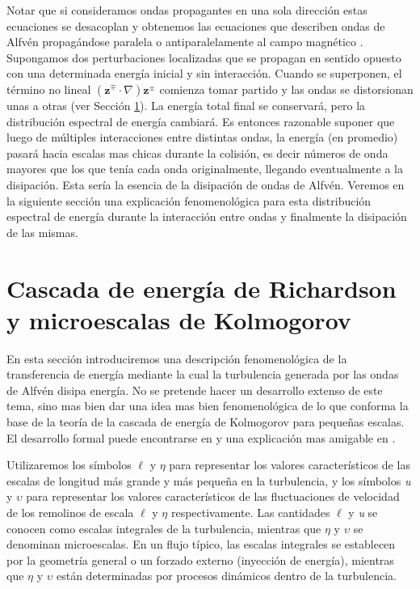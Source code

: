 \documentclass[a4paper,11pt]{report}
\begin{document}
Notar que si consideramos ondas propagantes en una sola dirección estas ecuaciones se desacoplan y obtenemos las ecuaciones que describen ondas de Alfvén propagándose paralela o antiparalelamente al campo magnético  \citep{magyar_2019}. %
Supongamos dos perturbaciones localizadas que se propagan en sentido opuesto con una determinada energía inicial y sin interacción. Cuando se superponen, el término no lineal $(\boldsymbol{z}^\mp \cdot \nabla)\boldsymbol{z}^\pm$ comienza tomar partido y las ondas se distorsionan unas a otras (ver Sección \ref{turbulencia}). La energía total final se conservará, pero la distribución espectral de energía cambiará. Es entonces razonable suponer que luego de múltiples interacciones entre distintas ondas, la energía (en promedio) pasará hacia escalas mas chicas durante la colisión, {es decir números de onda mayores que los que tenía cada onda originalmente}, llegando eventualmente a la disipación. Esta sería la esencia de la disipación de ondas de Alfvén. Veremos en la siguiente sección una explicación fenomenológica para esta distribución espectral de energía durante la interacción entre ondas y finalmente la disipación de las mismas.





\section{Cascada de energía de Richardson y microescalas de Kolmogorov} \label{turbulencia}


En esta sección introduciremos una descripción fenomenológica de la transferencia de energía mediante la cual la turbulencia generada por las ondas de Alfvén disipa energía. No se pretende hacer un desarrollo extenso de este tema, sino mas bien dar una idea mas bien fenomenológica de lo que conforma la base de la teoría de la cascada de energía de Kolmogorov para pequeñas escalas. El desarrollo formal puede encontrarse en \citet{kolmogorov_1941} y una explicación mas amigable en \citet{davidson_2013}.




Utilizaremos los símbolos $\ell$ y $\eta$ para representar los valores característicos de las escalas de longitud más grande y más pequeña en la turbulencia, y los símbolos \emph{u} y $\upsilon$ para representar los valores característicos de las fluctuaciones de velocidad de los remolinos de escala  $\ell$ y $\eta$ respectivamente. Las cantidades  $\ell$ y \emph{u} se conocen como escalas integrales de la turbulencia, mientras que $\eta$ y $\upsilon$ se denominan microescalas. En un flujo típico, las escalas integrales se establecen por la geometría general o un forzado externo (inyección de energía), mientras que $\eta$ y $\upsilon$ están determinadas por procesos dinámicos dentro de la turbulencia.
\end{document}
